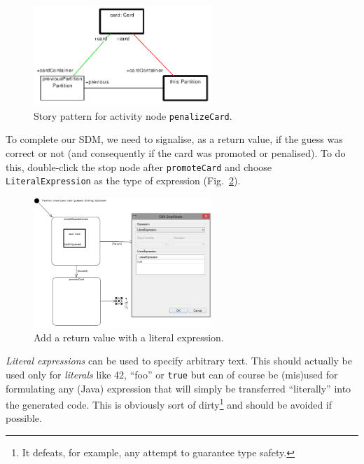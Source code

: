 \begin{figure}[htbp]
\begin{center}
  \includegraphics[width=0.6\textwidth]{pics/sdmBilder/check/sdm38}
  \caption{Story pattern for activity node \texttt{penalizeCard}.}
  \label{fig:sdm_check_complete_penalize}
\end{center}
\end{figure}

To complete our SDM, we need to signalise, as a return value, if the guess was
correct or not (and consequently if the card was promoted or penalised).  To do
this, double-click the stop node after \texttt{promoteCard} and choose
\texttt{LiteralExpression} as the type of expression
(Fig.~\ref{fig:sdm_check_literal_exp}).

\begin{figure}[htbp]
\begin{center}
  \includegraphics[width=0.6\textwidth]{pics/sdmBilder/check/sdm39}
  \caption{Add a return value with a literal expression.}
  \label{fig:sdm_check_literal_exp}
\end{center}
\end{figure}

\emph{Literal expressions} can be used
to specify arbitrary text.  This should actually be used only for
\emph{literals} like 42, ``foo'' or \texttt{true} but can of course be (mis)used
for formulating any (Java) expression that will simply be transferred
``literally'' into the  generated code. This is obviously sort of
dirty\footnote{It defeats, for example, any attempt to guarantee type safety.}
and should be avoided if possible.

